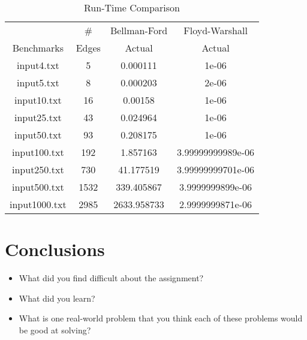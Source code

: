 \documentclass[twocolumn]{article}
\begin{document}
\begin{table}
    \caption{Run-Time Comparison}
    \begin{tabular}{|c|c|c|c|}
        \hline
        &\#&Bellman-Ford&Floyd-Warshall\\
        Benchmarks &Edges&Actual&Actual\\
        \hline
        input4.txt   &   5& 0.000111& 1e-06 \\
        input5.txt   &   8& 0.000203& 2e-06 \\
        input10.txt  &  16& 0.00158&  1e-06 \\
        input25.txt  &  43& 0.024964& 1e-06 \\
        input50.txt  &  93& 0.208175&  1e-06 \\
        input100.txt & 192& 1.857163& 3.99999999989e-06 \\
        input250.txt & 730& 41.177519& 3.99999999701e-06 \\
        input500.txt &1532& 339.405867& 3.9999999899e-06 \\
        input1000.txt&2985& 2633.958733& 2.9999999871e-06 \\
        \hline
    \end{tabular}
    \label{table::run-time}
\end{table}

\section{Conclusions}
\begin{itemize}
    \item What did you find difficult about the assignment?
    \item What did you learn?
    \item What is one real-world problem that you think each of these problems
    would be good at solving?
\end{itemize}
\end{document}
